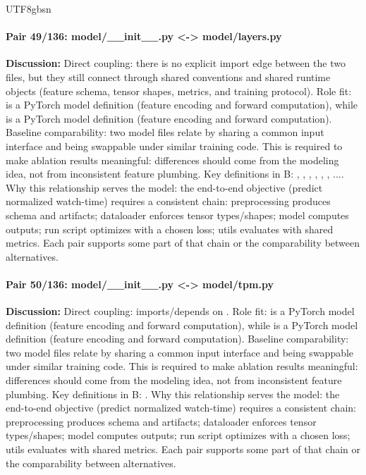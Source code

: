 \documentclass[11pt]{article}
\begin{document}
\begin{CJK*}{UTF8}{gbsn}
\paragraph{Pair 49/136: model/\_\_init\_\_.py <-> model/layers.py}
\textbf{Discussion:} Direct coupling: there is no explicit import edge between the two files, but they still connect through shared conventions and shared runtime objects (feature schema, tensor shapes, metrics, and training protocol). Role fit: \texttt{} is a PyTorch model definition (feature encoding and forward computation), while \texttt{} is a PyTorch model definition (feature encoding and forward computation). Baseline comparability: two model files relate by sharing a common input interface and being swappable under similar training code. This is required to make ablation results meaningful: differences should come from the modeling idea, not from inconsistent feature plumbing. Key definitions in B: \texttt{}, \texttt{}, \texttt{}, \texttt{}, \texttt{}, \texttt{}, .... Why this relationship serves the model: the end-to-end objective (predict normalized watch-time) requires a consistent chain: preprocessing produces schema and artifacts; dataloader enforces tensor types/shapes; model computes outputs; run script optimizes with a chosen loss; utils evaluates with shared metrics. Each pair supports some part of that chain or the comparability between alternatives.

\paragraph{Pair 50/136: model/\_\_init\_\_.py <-> model/tpm.py}
\textbf{Discussion:} Direct coupling: \texttt{} imports/depends on \texttt{}. Role fit: \texttt{} is a PyTorch model definition (feature encoding and forward computation), while \texttt{} is a PyTorch model definition (feature encoding and forward computation). Baseline comparability: two model files relate by sharing a common input interface and being swappable under similar training code. This is required to make ablation results meaningful: differences should come from the modeling idea, not from inconsistent feature plumbing. Key definitions in B: \texttt{}. Why this relationship serves the model: the end-to-end objective (predict normalized watch-time) requires a consistent chain: preprocessing produces schema and artifacts; dataloader enforces tensor types/shapes; model computes outputs; run script optimizes with a chosen loss; utils evaluates with shared metrics. Each pair supports some part of that chain or the comparability between alternatives.


\end{CJK*}
\end{document}
